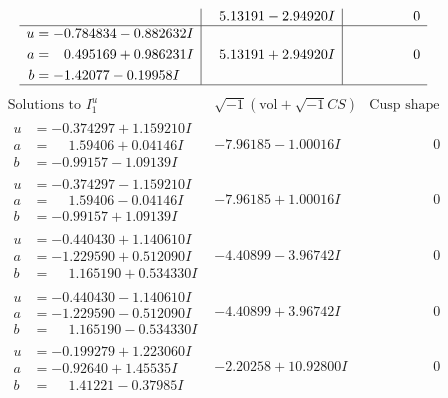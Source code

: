 \documentclass[1p]{elsarticle_modified}
\theoremstyle{definition}
\newcommand{\I}{\sqrt{-1}}
\begin{document}
$$\begin{array}{c|c|c}
 & \phantom{-}5.13191 - 2.94920 I & \phantom{-0.000000 } 0 \\ \hline\begin{aligned}
u &= -0.784834 - 0.882632 I \\
a &= \phantom{-}0.495169 + 0.986231 I \\
b &= -1.42077 - 0.19958 I\end{aligned}
 & \phantom{-}5.13191 + 2.94920 I & \phantom{-0.000000 } 0\\
 \hline 
 \end{array}$$\newpage$$\begin{array}{c|c|c}  
\text{Solutions to }I^u_{1}& \I (\text{vol} + \sqrt{-1}CS) & \text{Cusp shape}\\
 \hline 
\begin{aligned}
u &= -0.374297 + 1.159210 I \\
a &= \phantom{-}1.59406 + 0.04146 I \\
b &= -0.99157 - 1.09139 I\end{aligned}
 & -7.96185 - 1.00016 I & \phantom{-0.000000 } 0 \\ \hline\begin{aligned}
u &= -0.374297 - 1.159210 I \\
a &= \phantom{-}1.59406 - 0.04146 I \\
b &= -0.99157 + 1.09139 I\end{aligned}
 & -7.96185 + 1.00016 I & \phantom{-0.000000 } 0 \\ \hline\begin{aligned}
u &= -0.440430 + 1.140610 I \\
a &= -1.229590 + 0.512090 I \\
b &= \phantom{-}1.165190 + 0.534330 I\end{aligned}
 & -4.40899 - 3.96742 I & \phantom{-0.000000 } 0 \\ \hline\begin{aligned}
u &= -0.440430 - 1.140610 I \\
a &= -1.229590 - 0.512090 I \\
b &= \phantom{-}1.165190 - 0.534330 I\end{aligned}
 & -4.40899 + 3.96742 I & \phantom{-0.000000 } 0 \\ \hline\begin{aligned}
u &= -0.199279 + 1.223060 I \\
a &= -0.92640 + 1.45535 I \\
b &= \phantom{-}1.41221 - 0.37985 I\end{aligned}
 & -2.20258 + 10.92800 I & \phantom{-0.000000 } 0 \\ \hline\begin{aligned}

\end{aligned}
\end{array}$$
\end{document}
